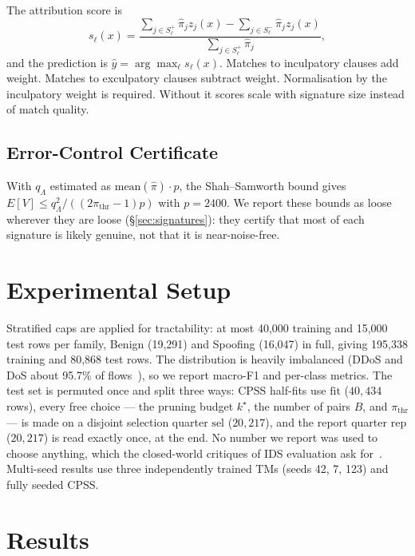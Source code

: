 \documentclass[conference]{IEEEtran}
\begin{document}
The attribution score is
\begin{equation}
s_\ell(x) = \frac{\sum_{j \in S_\ell^{+}} \hat{\pi}_j z_j(x) - \sum_{j \in S_\ell^{-}} \hat{\pi}_j z_j(x)}{\sum_{j \in S_\ell^{+}} \hat{\pi}_j},
\label{eq:score}
\end{equation}
and the prediction is $\hat{y} = \arg\max_\ell s_\ell(x)$. Matches to
inculpatory clauses add weight. Matches to exculpatory clauses subtract
weight. Normalisation by the inculpatory weight is required. Without it
scores scale with signature size instead of match quality.

\subsection{Error-Control Certificate}
\label{sec:cert}
With $q_\Lambda$ estimated as $\mathrm{mean}(\hat{\pi}) \cdot p$, the
Shah--Samworth bound gives
$E[V] \le q_\Lambda^2 / ((2\pi_{\mathrm{thr}} - 1) p)$ with $p = 2400$. We
report these bounds as loose wherever they are loose
(\S\ref{sec:signatures}): they certify that most of each signature is
likely genuine, not that it is near-noise-free.

\section{Experimental Setup}
\label{sec:setup}
Stratified caps are applied for tractability: at most 40{,}000 training
and 15{,}000 test rows per family, Benign (19{,}291) and Spoofing
(16{,}047) in full, giving 195{,}338 training and 80{,}868 test rows. The
distribution is heavily imbalanced (DDoS and DoS about 95.7\% of
flows~\cite{dadkhah2024}), so we report macro-F1 and per-class metrics.
The test set is permuted once and split three ways: CPSS half-fits use
$\mathrm{fit}$ ($40{,}434$ rows), every free choice --- the pruning budget
$k^{\star}$, the number of pairs $B$, and $\pi_{\mathrm{thr}}$ --- is made
on a disjoint selection quarter $\mathrm{sel}$ ($20{,}217$), and the report
quarter $\mathrm{rep}$ ($20{,}217$) is read exactly once, at the end. No
number we report was used to choose anything, which the closed-world
critiques of IDS evaluation ask
for~\cite{sommer2010,engelen2021,arp2022}. Multi-seed results use three
independently trained TMs (seeds 42, 7, 123) and fully seeded CPSS.

\section{Results}
\end{document}
